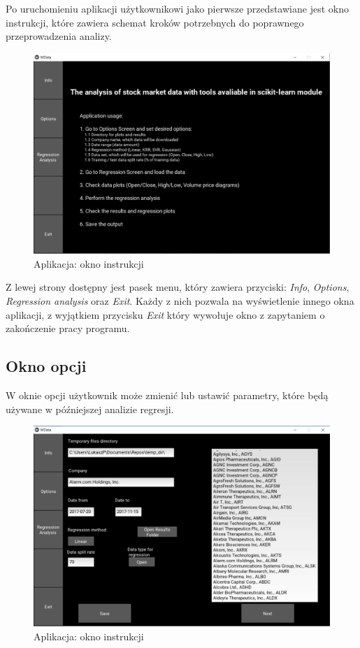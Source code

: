 Po uruchomieniu aplikacji użytkownikowi jako pierwsze przedstawiane jest okno instrukcji, które zawiera schemat kroków potrzebnych do poprawnego przeprowadzenia analizy.
\begin{figure}[h!]
\centering
\includegraphics[width=150mm]{pictures/app_info_screen.png}
\caption{Aplikacja: okno instrukcji}
\label{fig:Okno instrukcji}
\end{figure}

Z lewej strony dostępny jest pasek menu, który zawiera przyciski: \textit{Info}, \textit{Options}, \textit{Regression analysis} oraz \textit{Exit}.
Każdy z nich pozwala na wyświetlenie innego okna aplikacji, z wyjątkiem przycisku \textit{Exit} który wywołuje okno z zapytaniem o zakończenie pracy programu.

\subsection{Okno opcji}
W oknie opcji użytkownik może zmienić lub ustawić parametry, które będą używane w późniejszej analizie regresji.
\begin{figure}[h!]
\centering
\includegraphics[width=150mm]{pictures/app_options_screen.png}
\caption{Aplikacja: okno instrukcji}
\label{fig:Okno instrukcji}
\end{figure}


